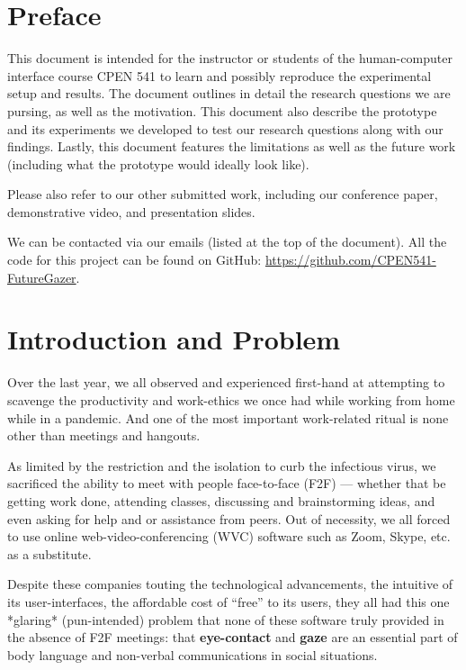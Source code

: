\documentclass[11pt,letterpaper]{article}
\begin{document}


\section*{Preface}

This document is intended for the instructor or students of the human-computer interface course CPEN 541 to learn and possibly reproduce the experimental setup and results. The document outlines in detail the research questions we are pursing, as well as the motivation. This document also describe the prototype and its experiments we developed to test our research questions along with our findings. Lastly, this document features the limitations as well as the future work (including what the prototype would ideally look like). 

Please also refer to our other submitted work, including our conference paper, demonstrative video, and presentation slides.

We can be contacted via our emails (listed at the top of the document). All the code for this project can be found on GitHub: \url{https://github.com/CPEN541-FutureGazer}.

\clearpage

\section{Introduction and Problem}

Over the last year, we all observed and experienced first-hand at attempting to scavenge the productivity and work-ethics we once had while working from home while in a pandemic. And one of the most important work-related ritual is none other than meetings and hangouts. 

As limited by the restriction and the isolation to curb the infectious virus, we sacrificed the ability to meet with people face-to-face (F2F) --- whether that be getting work done, attending classes, discussing and brainstorming ideas, and even asking for help and or assistance from peers. Out of necessity, we all forced to use online web-video-conferencing (WVC) software such as Zoom, Skype, etc. as a substitute.

Despite these companies touting the technological advancements, the intuitive of its user-interfaces, the affordable cost of “free” to its users, they all had this one *glaring* (pun-intended) problem that none of these software truly provided in the absence of F2F meetings: that \textbf{eye-contact} and \textbf{gaze} are an essential part of body language and non-verbal communications in social situations. 
\end{document}
